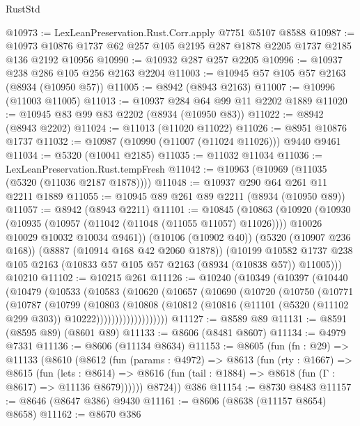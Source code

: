 \begin{lexlean}{RustStd}
\begin{coremodule}
@10973 := LexLeanPreservation.Rust.Corr.apply @7751 @5107 @8588
@10987 := @10973 @10876 @1737 @62 @257 @105 @2195 @287 @1878 @2205 @1737 @2185 @136 @2192 @10956
@10990 := @10932 @287 @257 @2205
@10996 := @10937 @238 @286 @105 @256 @2163 @2204
@11003 := @10945 @57 @105 @57 @2163 (@8934 (@10950 @57))
@11005 := @8942 (@8943 @2163)
@11007 := @10996 (@11003 @11005)
@11013 := @10937 @284 @64 @99 @11 @2202 @1889
@11020 := @10945 @83 @99 @83 @2202 (@8934 (@10950 @83))
@11022 := @8942 (@8943 @2202)
@11024 := @11013 (@11020 @11022)
@11026 := @8951 @10876 @1737
@11032 := @10987 (@10990 (@11007 (@11024 @11026))) @9440 @9461
@11034 := @5320 (@10041 @2185)
@11035 := @11032 @11034
@11036 := LexLeanPreservation.Rust.tempFresh
@11042 := @10963 (@10969 (@11035 (@5320 (@11036 @2187 @1878))))
@11048 := @10937 @290 @64 @261 @11 @2211 @1889
@11055 := @10945 @89 @261 @89 @2211 (@8934 (@10950 @89))
@11057 := @8942 (@8943 @2211)
@11101 := @10845
    (@10863
      (@10920
        (@10930
          (@10935 (@10957 (@11042 (@11048 (@11055 @11057) @11026))))
          @10026
          @10029
          @10032
          @10034
          @9461))
      (@10106 (@10902 @40))
      (@5320 (@10907 @236 @168))
      (@8887 (@10914 @168 @42 @2060 @1878))
      (@10199 @10582 @1737 @238 @105 @2163 (@10833 @57 @105 @57 @2163 (@8934 (@10838 @57)) @11005)))
    @10210
@11102 := @10215 @261
@11126 := @10240
    (@10349
      (@10397
        (@10440
          (@10479
            (@10533
              (@10583
                (@10620
                  (@10657
                    (@10690
                      (@10720
                        (@10750
                          (@10771
                            (@10787
                              (@10799
                                (@10803
                                  (@10808
                                    (@10812
                                      (@10816
                                        (@11101 (@5320 (@11102 @299 @303)) @10222)))))))))))))))))))
@11127 := @8589 @89
@11131 := @8591 (@8595 @89) (@8601 @89)
@11133 := @8606 (@8481 @8607)
@11134 := @4979 @7331
@11136 := @8606 (@11134 @8634)
@11153 := @8605
    (fun (fn : @29) =>
    @11133
      (@8610
        (@8612
          (fun (params : @4972) =>
          @8613
            (fun (rty : @1667) =>
            @8615
              (fun (lets : @8614) =>
              @8616 (fun (tail : @1884) => @8618 (fun (Γ : @8617) => @11136 @8679))))))
        @8724))
    @386
@11154 := @8730 @8483
@11157 := @8646 (@8647 @386) @9430
@11161 := @8606 (@8638 (@11157 @8654) @8658)
@11162 := @8670 @386

\end{coremodule}
\end{lexlean}
